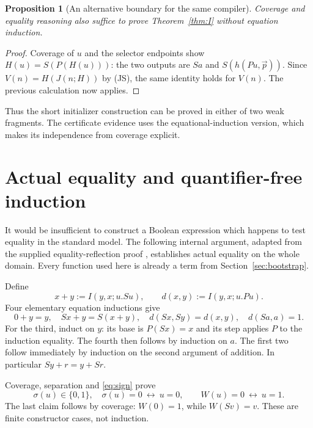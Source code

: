 \documentclass[11pt]{article}
\newtheorem{proposition}[theorem]{Proposition}
\theoremstyle{definition}
\begin{document}
\begin{proposition}[An alternative boundary for the same compiler]
Coverage and equality reasoning also suffice to prove
Theorem~\ref{thm:I} without equation induction.
\end{proposition}
\begin{proof}
Coverage of $u$ and the selector endpoints show
$H(u)=S(P(H(u)))$: the two outputs are $Sa$ and
$S(h(Pu,\vec p))$. Since $V(n)=H(J(n;H))$ by (JS), the same
identity holds for $V(n)$. The previous calculation now applies.
\end{proof}
Thus the short initializer construction can be proved in either of two
weak fragments. The certificate evidence uses the equational-induction
version, which makes its independence from coverage explicit.

\section{Actual equality and quantifier-free induction}
\label{sec:reflection}

It would be insufficient to construct a Boolean expression which happens
to test equality in the standard model. The following internal argument,
adapted from the supplied equality-reflection proof
\cite{choice,closure}, establishes actual equality on the whole domain.
Every function used here is already a term from Section~\ref{sec:bootstrap}.

Define
\[
 x+y:=I(y,x;u.Su),\qquad d(x,y):=I(y,x;u.Pu).
\]
Four elementary equation inductions give
\begin{equation}
 0+y=y,\quad Sx+y=S(x+y),\quad
 d(Sx,Sy)=d(x,y),\quad d(Sa,a)=1.
 \label{eq:elementary}
\end{equation}
For the third, induct on $y$: its base is $P(Sx)=x$ and its step
applies $P$ to the induction equality. The fourth then follows by
induction on $a$. The first two follow immediately by induction on the
second argument of addition. In particular $Sy+r=y+Sr$.

Coverage, separation and \eqref{eq:sign} prove
\[
 \sigma(u)\in\{0,1\},\quad
 \sigma(u)=0\ \longleftrightarrow\ u=0,
 \qquad W(u)=0\ \longleftrightarrow\ u=1.
 \label{eq:tests}
\]
The last claim follows by coverage: $W(0)=1$, while
$W(Sv)=v$. These are finite constructor cases, not induction.
\end{document}

